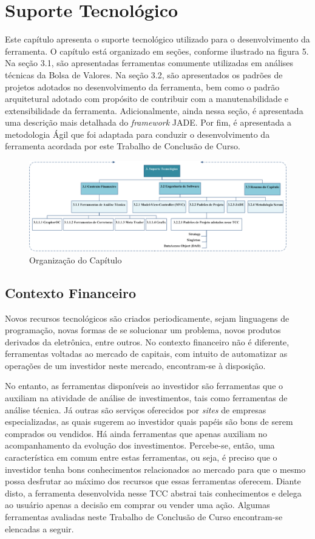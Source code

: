 \chapter[SUPORTE TECNOLÓGICO]{Suporte Tecnológico}

Este capítulo apresenta o suporte tecnológico utilizado para o desenvolvimento da ferramenta. O capítulo está organizado em seções, conforme ilustrado na figura 5. Na seção 3.1, são apresentadas ferramentas comumente utilizadas em análises técnicas da Bolsa de Valores. Na seção 3.2, são apresentados os padrões de projetos adotados no desenvolvimento da ferramenta, bem como o padrão arquitetural adotado com propósito de contribuir com a manutenabilidade e extensibilidade da ferramenta. Adicionalmente, ainda nessa seção, é apresentada uma descrição mais detalhada do \textit{framework} JADE. Por fim, é apresentada a metodologia Ágil que foi adaptada para conduzir o desenvolvimento da ferramenta acordada por este Trabalho de Conclusão de Curso.

\begin{figure}[h!]
\centering
\label{f10}
\includegraphics[width=1\textwidth]{figuras/cap3}
\caption{Organização do Capítulo}
\end{figure}
\FloatBarrier

\section{Contexto Financeiro}

Novos recursos tecnológicos são criados periodicamente, sejam linguagens de programação, novas formas de se solucionar um problema, novos produtos derivados da eletrônica, entre outros. No contexto financeiro não é diferente, ferramentas voltadas ao mercado de capitais, com intuito de automatizar as operações de um investidor neste mercado, encontram-se à disposição.

No entanto, as ferramentas disponíveis ao investidor são ferramentas que o auxiliam na atividade de análise de investimentos, tais como ferramentas de análise técnica. Já outras são serviços oferecidos por \textit{sites} de empresas especializadas, as quais sugerem ao investidor quais papéis são bons de serem comprados ou vendidos. Há ainda ferramentas que apenas auxiliam no acompanhamento da evolução dos investimentos. Percebe-se, então, uma característica em comum entre estas ferramentas, ou seja, é preciso que o investidor tenha bons conhecimentos relacionados ao mercado para que o mesmo possa desfrutar ao máximo dos recursos que essas ferramentas oferecem. Diante disto, a ferramenta desenvolvida nesse TCC abstrai tais conhecimentos e delega ao usuário apenas a decisão em comprar ou vender uma ação. Algumas ferramentas avaliadas neste Trabalho de Conclusão de Curso encontram-se elencadas a seguir.

